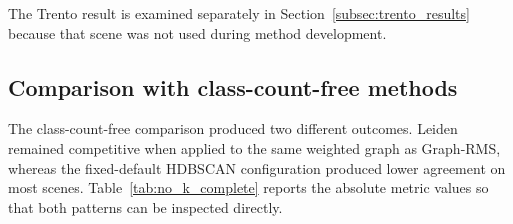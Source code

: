 \documentclass[10pt,a4paper,fleqn]{article}
\begin{document}
The Trento result is examined separately in
Section~\ref{subsec:trento_results} because that scene was not used during
method development.

\subsection{Comparison with class-count-free methods}
\label{subsec:no_k_results}

The class-count-free comparison produced two different outcomes. Leiden
remained competitive when applied to the same weighted graph as Graph-RMS,
whereas the fixed-default HDBSCAN configuration produced lower
agreement on most scenes. Table~\ref{tab:no_k_complete} reports the absolute
metric values so that both patterns can be inspected directly.
\end{document}
